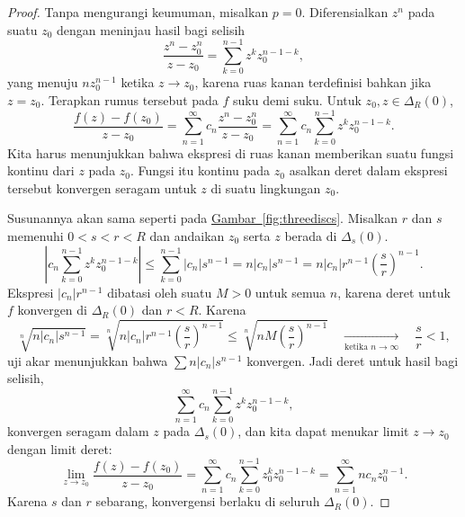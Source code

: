 \documentclass[12pt,openany]{book}
\newcommand{\sabs}[1]{\lvert {#1} \rvert}
\newcommand{\abs}[1]{\left\lvert {#1} \right\rvert}
\theoremstyle{plain}
\theoremstyle{remark}
\theoremstyle{definition}
\theoremstyle{exercise}
\theoremstyle{example}
\newcommand{\figureref}[1]{\hyperref[#1]{Gambar~\ref*{#1}}}
\begin{document}
\begin{proof}
Tanpa mengurangi keumuman, misalkan $p=0$.
Diferensialkan $z^n$ pada suatu $z_0$ dengan meninjau hasil bagi
selisih
\begin{equation*}
\frac{z^n-z_0^n}{z-z_0}
=
\sum_{k=0}^{n-1}
z^k z_0^{n-1-k} ,
\end{equation*}
yang menuju $n z_0^{n-1}$ ketika $z \to z_0$, karena
ruas kanan terdefinisi bahkan jika $z = z_0$.
Terapkan rumus tersebut pada $f$
suku demi suku.  Untuk $z_0,z \in \Delta_R(0)$,
\begin{equation*}
\frac{f(z) - f(z_0)}{z-z_0}
=
\sum_{n=1}^\infty c_n \frac{z^n-z_0^n}{z-z_0}
=
\sum_{n=1}^\infty c_n \sum_{k=0}^{n-1} z^k z_0^{n-1-k} .
\end{equation*}
Kita harus menunjukkan bahwa ekspresi di ruas kanan memberikan suatu fungsi kontinu dari $z$
pada $z_0$.
Fungsi itu kontinu pada $z_0$ asalkan deret
dalam ekspresi tersebut konvergen seragam untuk $z$ di suatu
lingkungan $z_0$.

Susunannya akan sama seperti pada \figureref{fig:threediscs}.
Misalkan $r$ dan $s$ memenuhi $0 < s < r < R$ dan andaikan $z_0$ serta $z$ berada
di $\Delta_s(0)$.
\begin{equation*}
\abs{c_n \sum_{k=0}^{n-1} z^k z_0^{n-1-k}}
\leq
\sum_{k=0}^{n-1} 
\sabs{c_n}
s^{n-1}
=
n
\sabs{c_n} s^{n-1}
=
n
\sabs{c_n} r^{n-1} {\left(\frac{s}{r}\right)}^{n-1} .
\end{equation*}
Ekspresi
$\sabs{c_n} r^{n-1}$ dibatasi oleh suatu $M > 0$ untuk semua $n$,
karena deret untuk $f$ konvergen
di $\Delta_R(0)$ dan $r < R$.
Karena
\begin{equation*}
\sqrt[n]{
n \sabs{c_n} s^{n-1}
}
=
\sqrt[n]{
n \sabs{c_n} r^{n-1} {\left(\frac{s}{r}\right)}^{n-1}
}
\leq
\sqrt[n]{
n M {\left(\frac{s}{r}\right)}^{n-1}
}
\quad\underset{\text{ketika } n \to \infty}{\to}\quad
\frac{s}{r} < 1 ,
\end{equation*}
uji akar menunjukkan bahwa
$\sum n \sabs{c_n} s^{n-1}$
konvergen.
Jadi deret untuk hasil bagi selisih,
\begin{equation*}
\sum_{n=1}^\infty c_n \sum_{k=0}^{n-1} z^k z_0^{n-1-k} ,
\end{equation*}
konvergen seragam dalam $z$ pada $\Delta_s(0)$, dan
kita dapat menukar limit $z \to z_0$ dengan limit deret:
\begin{equation*}
\lim_{z \to z_0}
\frac{f(z)-f(z_0)}{z-z_0}
=
\sum_{n=1}^\infty c_n \sum_{k=0}^{n-1} z_0^k z_0^{n-1-k}
=
\sum_{n=1}^\infty n c_n z_0^{n-1} .
\end{equation*}
Karena $s$ dan $r$ sebarang, konvergensi berlaku di seluruh
$\Delta_R(0)$.
\end{proof}
\end{document}
